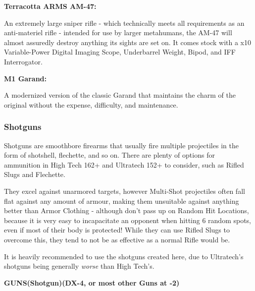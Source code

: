 \begin{multicols}{2}
\begin{breakbox}
	\textbf{Terracotta ARMS AM-47:}
	
	An extremely large sniper rifle - which technically meets all requirements as an anti-materiel rifle - intended for use by larger metahumans, the AM-47 will almost assuredly destroy anything its sights are set on. It comes stock with a x10 Variable-Power Digital Imaging Scope, Underbarrel Weight, Bipod, and IFF Interrogator.
	
	\textbf{M1 Garand:}
	
	A modernized version of the classic Garand that maintains the charm of the original without the expense, difficulty, and maintenance.
		
\end{breakbox}
\end{multicols}

\subsubsection{Shotguns}

Shotguns are smoothbore firearms that usually fire multiple projectiles in the form of shotshell, flechette, and so on. There are plenty of options for ammunition in High Tech 162+ and Ultratech 152+ to consider, such as Rifled Slugs and Flechette. 

They excel against unarmored targets, however Multi-Shot projectiles often fall flat against any amount of armour, making them unsuitable against anything better than Armor Clothing - although don't pass up on Random Hit Locations, because it is very easy to incapacitate an opponent when hitting 6 random spots, even if most of their body is protected! While they can use Rifled Slugs to overcome this, they tend to not be as effective as a normal Rifle would be.

It is heavily recommended to use the shotguns created here, due to Ultratech's shotguns being generally \textit{worse} than High Tech's.

\textbf{GUNS(Shotgun)(DX-4, or most other Guns at -2)}
\begin{center} 
	\begin{adjustwidth}{-8mm}{}
	\end{adjustwidth}
\end{center}

